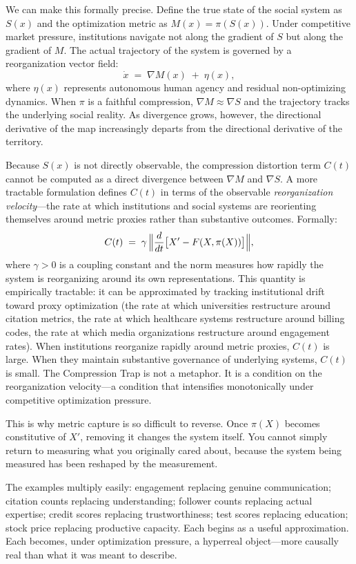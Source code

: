 \documentclass[11pt, letterpaper]{article}
\begin{document}
We can make this formally precise. Define the true state of the social system as $S(x)$ and the optimization metric as $M(x) = \pi(S(x))$. Under competitive market pressure, institutions navigate not along the gradient of $S$ but along the gradient of $M$. The actual trajectory of the system is governed by a reorganization vector field:
\[
  \dot{x} \;=\; \nabla M(x) \;+\; \eta(x),
\]
where $\eta(x)$ represents autonomous human agency and residual non-optimizing dynamics. When $\pi$ is a faithful compression, $\nabla M \approx \nabla S$ and the trajectory tracks the underlying social reality. As divergence grows, however, the directional derivative of the map increasingly departs from the directional derivative of the territory.

Because $S(x)$ is not directly observable, the compression distortion term $C(t)$ cannot be computed as a direct divergence between $\nabla M$ and $\nabla S$. A more tractable formulation defines $C(t)$ in terms of the observable \emph{reorganization velocity}---the rate at which institutions and social systems are reorienting themselves around metric proxies rather than substantive outcomes. Formally:
\[
  C(t) \;=\; \gamma\,\Bigl\|\frac{d}{dt}\bigl[X' - F(X, \pi(X))\bigr]\Bigr\|,
\]
where $\gamma > 0$ is a coupling constant and the norm measures how rapidly the system is reorganizing around its own representations. This quantity is empirically tractable: it can be approximated by tracking institutional drift toward proxy optimization (the rate at which universities restructure around citation metrics, the rate at which healthcare systems restructure around billing codes, the rate at which media organizations restructure around engagement rates). When institutions reorganize rapidly around metric proxies, $C(t)$ is large. When they maintain substantive governance of underlying systems, $C(t)$ is small. The Compression Trap is not a metaphor. It is a condition on the reorganization velocity---a condition that intensifies monotonically under competitive optimization pressure.

This is why metric capture is so difficult to reverse. Once $\pi(X)$ becomes constitutive of $X'$, removing it changes the system itself. You cannot simply return to measuring what you originally cared about, because the system being measured has been reshaped by the measurement.

The examples multiply easily: engagement replacing genuine communication; citation counts replacing understanding; follower counts replacing actual expertise; credit scores replacing trustworthiness; test scores replacing education; stock price replacing productive capacity. Each begins as a useful approximation. Each becomes, under optimization pressure, a hyperreal object---more causally real than what it was meant to describe.
\end{document}
